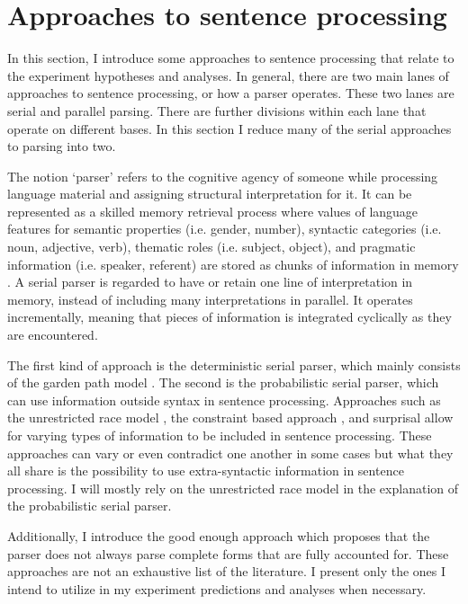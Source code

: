 \section{Approaches to sentence processing}

In this section, I introduce some approaches to sentence processing that relate to the experiment hypotheses and analyses. In general, there are two main lanes of approaches to sentence processing, or how a parser operates. These two lanes are serial and parallel parsing. There are further divisions within each lane that operate on different bases. In this section I reduce many of the serial approaches to parsing into two.

The notion `parser' refers to the cognitive agency of someone while processing language material and assigning structural interpretation for it. It can be represented as a skilled memory retrieval process \citep{lewis2005activation} where values of language features for semantic properties (i.e. gender, number), syntactic categories (i.e. noun, adjective, verb), thematic roles (i.e. subject, object), and pragmatic information (i.e. speaker, referent) are stored as chunks of information in memory \citep{Miller1956}. A serial parser is regarded to have or retain one line of interpretation in memory, instead of including many interpretations in parallel. It operates incrementally, meaning that pieces of information is integrated cyclically as they are encountered.
 
The first kind of approach is the deterministic serial parser, which mainly consists of the garden path model \citep{frazier1978sausage, frazier1987sentence}. The second is the probabilistic serial parser, which can use information outside syntax in sentence processing. Approaches such as the unrestricted race model \citep{traxler1998adjunct,van2001reanalysis, van2005evidence}, the constraint based approach \citep{MacDonald1994}, and surprisal \citep{levy2008expectation} allow for varying types of information to be included in sentence processing. These approaches can vary or even contradict one another in some cases but what they all share is the possibility to use extra-syntactic information in sentence processing. I will mostly rely on the unrestricted race model in the explanation of the probabilistic serial parser.

Additionally, I introduce the good enough approach \citep{ferreira2001misinterpretations, ferreira2007good} which proposes that the parser does not always parse complete forms that are fully accounted for. These approaches are not an exhaustive list of the literature. I present only the ones I intend to utilize in my experiment predictions and analyses when necessary.




